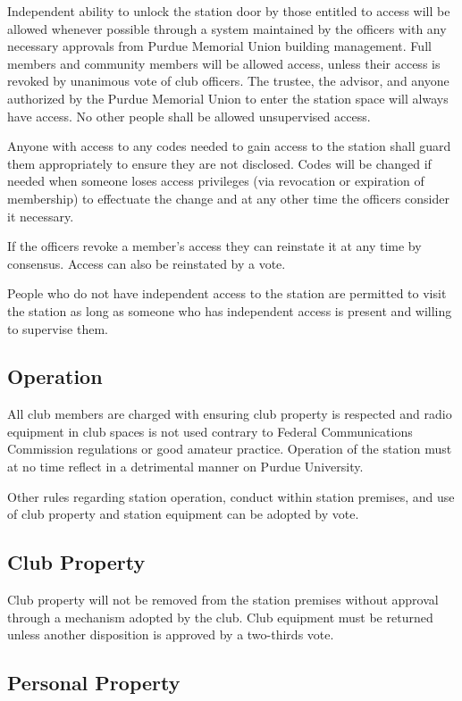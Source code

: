 \documentclass{article}
\begin{document}
Independent ability to unlock the station door by those entitled to access will
be allowed whenever possible through a system maintained by the officers with
any necessary approvals from Purdue Memorial Union building management. Full
members and community members will be allowed access, unless their access is
revoked by unanimous vote of club officers. The trustee, the advisor, and anyone
authorized by the Purdue Memorial Union to enter the station space will always
have access. No other people shall be allowed unsupervised access.

Anyone with access to any codes needed to gain access to the station shall guard
them appropriately to ensure they are not disclosed. Codes will be changed if
needed when someone loses access privileges (via revocation or expiration of
membership) to effectuate the change and at any other time the officers consider
it necessary.

If the officers revoke a member's access they can reinstate it at any time by
consensus. Access can also be reinstated by a vote.

People who do not have independent access to the station are permitted to visit
the station as long as someone who has independent access is present and willing
to supervise them.

\subsection{Operation}

All club members are charged with ensuring club property is respected and radio
equipment in club spaces is not used contrary to Federal Communications
Commission regulations or good amateur practice. Operation of the station must
at no time reflect in a detrimental manner on Purdue University.

Other rules regarding station operation, conduct within station premises, and
use of club property and station equipment can be adopted by vote.

\subsection{Club Property}

Club property will not be removed from the station premises without approval
through a mechanism adopted by the club. Club equipment must be returned unless
another disposition is approved by a two-thirds vote.

\subsection{Personal Property}
\end{document}

